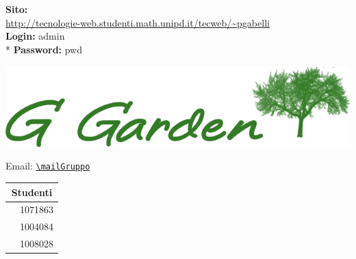 \thispagestyle{empty}

\begin{titlepage}

	\begin{center}
		\dataUM \\
		\textbf{
			\uni \\
			\cdl \\
			\uniAA \\
		}
		\HRule \\[0.4cm]
			\begin{Huge}
				{\huge \bfseries \titoloDocumento}\\[0.4cm]
			\end{Huge}
		\HRule \\[2.5cm]
		
		\vspace{1cm}
		\textbf{Sito:} \\
		\url{http://tecnologie-web.studenti.math.unipd.it/tecweb/~pgabelli} \\
		\vspace{1cm}
		\textbf{Login:} admin \\*
		\textbf{Password:} pwd \\

		
		
		\begin{center}
			\includegraphics[scale=0.75]{./sezioni/img/Logo.png}
		\end{center}
		Email: 
		\href{mailto:\mailGruppo}{\nolinkurl{\mailGruppo} } \\
		\vspace{3cm}
		

		
		\vfill
		\begin{table}[b]
		\begin{center}
			\begin{tabular}{r | l}
				\multicolumn{2}{c}{\textbf{Studenti}}\\
				\midrule
				\AG	&	1071863	\\
				\SM	&	1004084	\\
				\PG	&	1008028	\\
				\midrule
			\end{tabular}
		\end{center}
		\end{table}
	

\end{center}
\end{titlepage}
